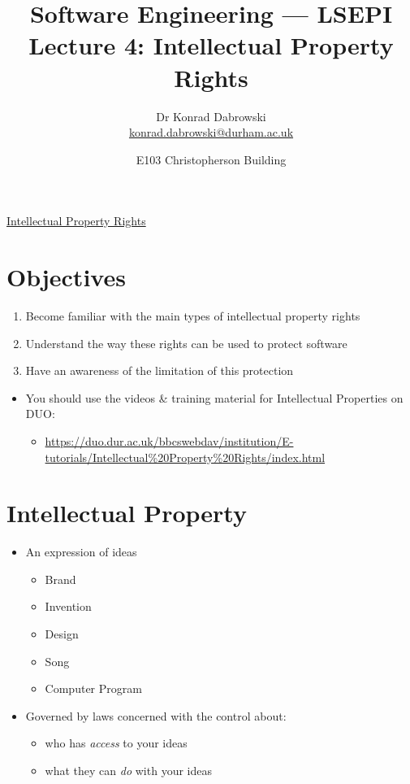 \documentclass{article}
\title{Software Engineering --- LSEPI Lecture 4: Intellectual Property Rights}
\author{Dr Konrad Dabrowski\\
\href{mailto://konrad.dabrowski@durham.ac.uk}{konrad.dabrowski@durham.ac.uk}
}
\date{E103 Christopherson Building}
\begin{document}
\begin{center}
	\underline{\huge Intellectual Property Rights}
\end{center}




\section{Objectives}
\begin{enumerate}
\item Become familiar with the main types of intellectual property rights
\item Understand the way these rights can be used to protect software
\item Have an awareness of the limitation of this protection
\end{enumerate}
\begin{itemize}
\item You should use the videos \& training material for Intellectual Properties on DUO:
\begin{itemize}
\item \url{https://duo.dur.ac.uk/bbcswebdav/institution/E-tutorials/Intellectual\%20Property\%20Rights/index.html}
\end{itemize}
\end{itemize}



\section{Intellectual Property}
\begin{itemize}
\item An expression of ideas
\begin{itemize}
\item Brand
\item Invention
\item Design
\item Song
\item Computer Program
\end{itemize}
\item Governed by laws concerned with the control about:
\begin{itemize}
\item who has \emph{access} to your ideas
\item what they can \emph{do} with your ideas
\end{itemize}
\end{itemize}
\end{document}
